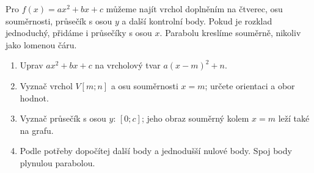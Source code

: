 \documentclass[11pt,a4paper]{article}
\begin{document}
Pro $f(x)=ax^2+bx+c$ můžeme najít vrchol doplněním na čtverec, osu souměrnosti, průsečík s osou $y$ a další kontrolní body. Pokud je rozklad jednoduchý, přidáme i průsečíky s osou $x$. Parabolu kreslíme souměrně, nikoliv jako lomenou čáru.
\begin{enumerate}[label=\arabic*.]
\item Uprav $ax^2+bx+c$ na vrcholový tvar $a(x-m)^2+n$.
\item Vyznač vrchol $V[m;n]$ a osu souměrnosti $x=m$; určete orientaci a obor hodnot.
\item Vyznač průsečík s osou $y$: $[0;c]$; jeho obraz souměrný kolem $x=m$ leží také na grafu.
\item Podle potřeby dopočítej další body a jednodušší nulové body. Spoj body plynulou parabolou.
\end{enumerate}
\end{document}

